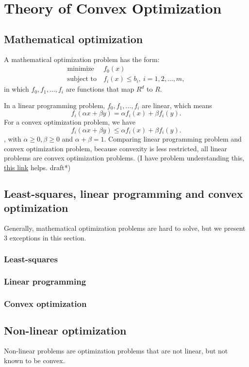 \documentclass{report}
\begin{document}
\chapter{Theory of Convex Optimization}
\section{Mathematical optimization}
A mathematical optimization problem has the form:
\begin{align*}
	\text{minimize}\ &f_0(x) \\
	\text{subject to}\ &f_i(x) \le  b_i,\ i = 1,2,\ldots,m,
\end{align*}
in which $f_0, f_1, \ldots, f_i$ are functions that map $R^d$ to $R$.

In a linear programming problem,  $f_0, f_1, \ldots, f_i$ are linear, which means \[
	f_i(\alpha x + \beta y) = \alpha f_i(x) + \beta f_i(y).
\] For a convex optimization problem, we have \[
	f_i(\alpha x + \beta y) \le  \alpha f_i(x) + \beta f_i(y)
.\] , with $\alpha \ge 0, \beta \ge 0$ and $\alpha + \beta = 1$.
Comparing linear programming problem and convex optimization problem, because convexity is less restricted, all linear problems are convex optimization problems. (I have problem understanding this, \href{https://math.stackexchange.com/q/4231709/727493}{this link} helps. draft*)
\section{Least-squares, linear programming and convex optimization}
Generally, mathematical optimization problems are hard to solve, but we present 3 exceptions in this section.
\subsection{Least-squares}
\subsection{Linear programming}
\subsection{Convex optimization}
\section{Non-linear optimization}
Non-linear problems are optimization problems that are not linear, but not known to be convex.
\end{document}
